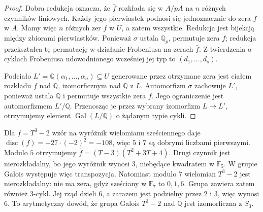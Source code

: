 \begin{proof}
Dobra redukcja oznacza, że $\bar f$ rozkłada się w $A/pA$
na $n$ różnych czynników liniowych. Każdy jego pierwiastek
podnosi się jednoznacznie do zera $f$ w $A$.
Mamy więc $n$ różnych zer $f$ w $U$, a zatem wszystkie.
Redukcja jest bijekcją między zbiorami pierwiastków.
Ponieważ $\sigma$ ustala $\mathbb Q_p$, permutuje zera $f$;
redukcja przekształca tę permutację w działanie Frobeniusa
na zerach $\bar f$. Z twierdzenia o cyklach Frobeniusa
udowodnionego wcześniej jej typ to $(d_1,\ldots,d_s)$.

Podciało $L'=\mathbb Q(\alpha_1,\ldots,\alpha_n)\subseteq U$
generowane przez otrzymane zera jest ciałem rozkładu $f$
nad $\mathbb Q$, izomorficznym nad $\mathbb Q$ z $L$.
Automorfizm $\sigma$ zachowuje $L'$, ponieważ ustala
$\mathbb Q$ i permutuje wszystkie zera $f$. Jego ograniczenie
jest automorfizmem $L'/\mathbb Q$. Przenosząc je przez
wybrany izomorfizm $L\to L'$, otrzymujemy element
$\operatorname{Gal}(L/\mathbb Q)$ o żądanym typie cykli.
\end{proof}

\begin{przyklad}
\label{aa:prz:modp-cubic-two}
Dla $f=T^3-2$ wzór na wyróżnik wielomianu sześciennego daje
$\operatorname{disc}(f)=-27\cdot(-2)^2=-108$, więc $5$ i $7$
są dobrymi liczbami pierwszymi. Modulo $5$ otrzymujemy
$\bar f=(T-3)(T^2+3T+4)$. Drugi czynnik jest nierozkładalny, bo jego wyróżnik wynosi $3$, niebędące kwadratem w $\mathbb F_5$. W grupie Galois występuje więc transpozycja. Natomiast modulo $7$ wielomian $T^3-2$ jest nierozkładalny: nie ma zera, gdyż sześciany w $\mathbb F_7$ to $0,1,6$. Grupa zawiera zatem również $3$-cykl. Jej rząd dzieli $6$,
a zarazem jest podzielny przez $2$ i $3$, więc wynosi $6$.
To arytmetyczny dowód, że grupa Galois $T^3-2$ nad $\mathbb Q$
jest izomorficzna z $S_3$.
\end{przyklad}
